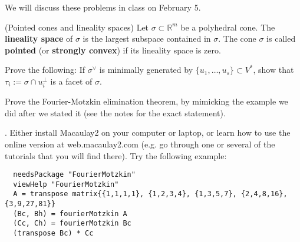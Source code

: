 \documentclass{exam}
\newcommand{\rr}{\mathbb{R}}
\begin{document}
We will discuss these problems in class on February 5.

\begin{questions}
  
  \question (Pointed cones and lineality spaces)
  Let $\sigma \subset \rr^m$ be a polyhedral cone.  The {\bf lineality space} of $\sigma$ is
  the largest subspace contained in $\sigma$. The cone $\sigma$ is called {\bf pointed} (or {\bf strongly convex}) if
  its lineality space is zero.


  \question Prove the following: If $\sigma^\vee$ is minimally generated by $\{ u_1, \ldots, u_s\} \subset V^*$, show that
  $\tau_i := \sigma \cap u_i^\perp$ is a facet of $\sigma$.

  \question Prove the Fourier-Motzkin elimination theorem, by mimicking the example we did after we stated it (see the notes for the exact statement).
  
  .
  Either install Macaulay2 on your computer or laptop, or learn how to use the online version at web.macaulay2.com (e.g. go
  through one or several of the tutorials that you will find there).
  Try the following example:
\begin{verbatim}
  needsPackage "FourierMotzkin"
  viewHelp "FourierMotzkin"
  A = transpose matrix{{1,1,1,1}, {1,2,3,4}, {1,3,5,7}, {2,4,8,16}, {3,9,27,81}}
  (Bc, Bh) = fourierMotzkin A
  (Cc, Ch) = fourierMotzkin Bc
  (transpose Bc) * Cc
  \end{verbatim}
  \begin{parts}

\end{parts}
\end{questions}
\end{document}
